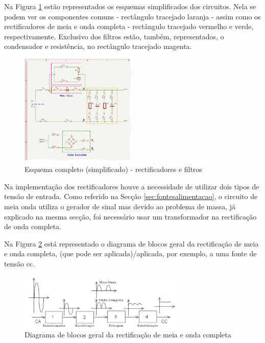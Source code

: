 Na Figura \ref{fig:rectificacao_filtragem_full} estão representados os esquemas simplificados dos circuitos. Nela se podem ver os componentes comuns - rectângulo tracejado laranja - assim como os rectificadores de meia e onda completa - rectângulo tracejado vermelho e verde, respectivamente. Exclusivo dos filtros estão, também, representados, o condensador e resistência, no rectângulo tracejado magenta.

\begin{figure}[hbtp]
	\centering
	\includegraphics[width=0.5\textwidth]{figures/rec_fil_FULL.png}
	\caption{Esquema completo (simplificado) - rectificadores e filtros}
	\label{fig:rectificacao_filtragem_full}
\end{figure}

Na implementação dos rectificadores houve a necessidade de utilizar dois tipos de tensão de entrada. Como referido na Secção \ref{sec:fontesalimentacao}, o circuito de meia onda utiliza o gerador de sinal mas devido ao problema de massa, já explicado na mesma secção, foi necessário usar um transformador na rectificação de onda completa.

Na Figura \ref{fig:blocosrectificacao} está representado o diagrama de blocos geral da rectificação de meia e onda completa, (que pode ser aplicada)/aplicada, por exemplo, a uma fonte de tensão \acrshort{cc}.

\begin{figure}[hbtp]
	\centering
	\includegraphics[width=0.7\textwidth]{figures/diagramablocosrectificacao.png}
	\caption{Diagrama de blocos geral da rectificação de meia e onda completa}
	\label{fig:blocosrectificacao}
\end{figure}

